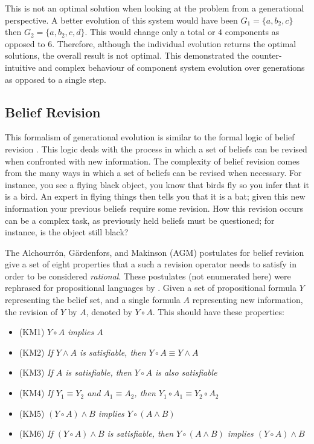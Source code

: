 This is not an optimal solution when looking at the problem from a generational perspective.
A better evolution of this system would have been $G_1 = \{a,b_2,c\}$ then $G_2 = \{a,b_2,c,d\}$.
This would change only a total or $4$ components as opposed to $6$.
Therefore, although the individual evolution returns the optimal solutions, the overall result is not optimal.
This demonstrated the counter-intuitive and complex behaviour of component system evolution over generations as opposed to a single step.

\subsection{Belief Revision}
This formalism of generational evolution is similar to the formal logic of belief revision \citep{alchourron1985logic}.
This logic deals with the process in which a set of beliefs can be revised when confronted with new information.
The complexity of belief revision comes from the many ways in which a set of beliefs can be revised when necessary.
For instance, you see a flying black object, you know that birds fly so you infer that it is a bird.
An expert in flying things then tells you that it is a bat; given this new information your previous beliefs require some revision.
How this revision occurs can be a complex task, as previously held beliefs must be questioned; for instance, is the object still black?

The Alchourrón, G\"ardenfors, and Makinson (AGM) \citep{alchourron1985logic} postulates for belief revision give a set of eight properties 
that a such a revision operator needs to satisfy in order to be considered \textit{rational}.
These postulates (not enumerated here) were rephrased for propositional languages by \citep{katsuno1991propositional}. 
Given a set of propositional formula $Y$ representing the belief set, and a single formula $A$ representing new information, the revision of $Y$ by $A$, denoted by $Y \circ A$.
This should have these properties:

\begin{itemize}
  \item (KM1) \textit{ $Y \circ A$  implies $A$}
  \item (KM2) \textit{ If $Y \wedge A$  is satisfiable, then $Y \circ A \equiv Y \wedge A$}
  \item (KM3) \textit{ If $A$ is satisfiable, then $Y \circ A$  is also satisfiable}
  \item (KM4) \textit{ If $Y_1 \equiv Y_2$ and $A_1 \equiv A_2$, then $Y_1 \circ A_1 \equiv Y_2 \circ A_2$}
  \item (KM5) \textit{ $(Y \circ A) \wedge B$  implies $Y \circ (A \wedge B)$}
  \item (KM6) \textit{ If $(Y \circ A) \wedge B$ is satisfiable, then $Y \circ (A \wedge B)$ implies $(Y \circ A) \wedge B$}
\end{itemize} 

